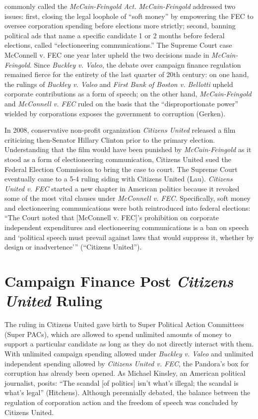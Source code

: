 \documentclass[12pt, a4paper, twoside]{article}
\begin{document}
commonly called the \emph{McCain-Feingold Act. McCain-Feingold} addressed two issues: first, closing the legal loophole of “soft money” by empowering the FEC to oversee corporation spending before elections more strictly; second, banning political ads that name a specific candidate 1 or 2 months before federal elections, called “electioneering communications.” The Supreme Court case McConnell v. FEC one year later upheld the two decisions made in \emph{McCain-Feingold}. Since \emph{Buckley v. Valeo}, the debate over campaign finance regulation remained fierce for the entirety of the last quarter of 20th century: on one hand, the rulings of \emph{Buckley v. Valeo} and \emph{First Bank of Boston v. Bellotti} upheld corporate contributions as a form of speech; on the other hand, \emph{McCain-Feingold} and \emph{McConnell v. FEC} ruled on the basis that the “disproportionate power” wielded by corporations exposes the government to corruption (Gerken). 

In 2008, conservative non-profit organization \emph{Citizens United} released a film criticizing then-Senator Hillary Clinton prior to the primary election. Understanding that the film would have been punished by \emph{McCain-Feingold} as it stood as a form of electioneering communication, Citizens United sued the Federal Election Commission to bring the case to court. The Supreme Court eventually came to a 5-4 ruling siding with Citizens United (Lau). \emph{Citizens United v. FEC} started a new chapter in American politics because it revoked some of the most vital clauses under \emph{McConnell v. FEC.} Specifically, soft money and electioneering communications were both reintroduced into federal elections: “The Court noted that [McConnell v. FEC]’s prohibition on corporate independent expenditures and electioneering communications is a ban on speech and ‘political speech must prevail against laws that would suppress it, whether by design or inadvertence’” (“Citizens United”). 

\section{Campaign Finance Post \emph{Citizens United} Ruling}

The ruling in Citizens United gave birth to Super Political Action Committees (Super PACs), which are allowed to spend unlimited amounts of money to support a particular candidate as long as they do not directly interact with them. With unlimited campaign spending allowed under \emph{Buckley v. Valeo} and unlimited independent spending allowed by \emph{Citizens United v. FEC}, the Pandora's box for corruption has already been opened. As Michael Kinsley, an American political journalist, posits: “The scandal [of politics] isn’t what’s illegal; the scandal is what’s legal” (Hitchens). Although perennially debated, the balance between the regulation of corporation action and the freedom of speech was concluded by Citizens United. 
\end{document}
